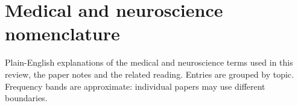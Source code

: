 \clearpage
{}
\label{sec:medical-nomenclature}
\section*{Medical and neuroscience nomenclature}
Plain-English explanations of the medical and neuroscience terms used
in this review, the paper notes and the related reading. Entries are
grouped by topic. Frequency bands are approximate: individual papers
may use different boundaries.

\begingroup
\small
\setlength{\LTpre}{5pt}
\setlength{\LTpost}{5pt}
\newcommand{\medicalterm}[2]{\textbf{#1} & #2\\[4pt]}
\newcommand{\medicalgroup}[1]{\multicolumn{2}{@{}l}{\rule{0pt}{2.2em}\large\bfseries #1}\\*[6pt]}
